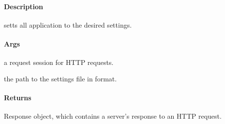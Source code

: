 \documentclass[letterpaper,10pt,english]{sphinxmanual}
\begin{document}
\begin{fulllineitems}
\label{\detokenize{gemini_lidar_hub_API:gemini_lidar_hub_API.set_lidar_hub_all_settings}}
\pysigstartsignatures
{}
\pysigstopsignatures

\paragraph{Description}
\label{\detokenize{gemini_lidar_hub_API:id44}}
\sphinxAtStartPar
setts all application to the desired settings.


\paragraph{Args}
\label{\detokenize{gemini_lidar_hub_API:id45}}\begin{description}
\sphinxAtStartPar
a request session for HTTP requests.

\sphinxAtStartPar
the path to the settings file in  format.

\end{description}


\paragraph{Returns}
\label{\detokenize{gemini_lidar_hub_API:id46}}\begin{description}
\sphinxAtStartPar
Response object, which contains a server’s response to an HTTP request.

\end{description}

\end{fulllineitems}

\end{document}
